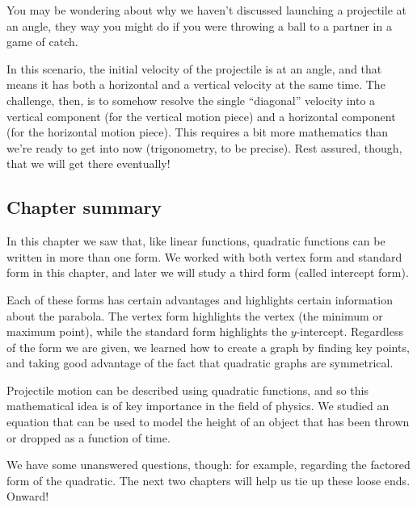 You may be wondering about why we haven't discussed launching a projectile at an angle, they way you might do if you were throwing a ball to a partner in a game of catch.

In this scenario, the initial velocity of the projectile is at an angle, and that means it has both a horizontal and a vertical velocity at the same time. The challenge, then, is to somehow resolve the single ``diagonal'' velocity into a vertical component (for the vertical motion piece) and a horizontal component (for the horizontal motion piece). This requires a bit more mathematics than we're ready to get into now (trigonometry, to be precise). Rest assured, though, that we will get there eventually!


\subsection*{Chapter summary}

In this chapter we saw that, like linear functions, quadratic functions can be written in more than one form. We worked with both vertex form and standard form in this chapter, and later we will study a third form (called intercept form).

Each of these forms has certain advantages and highlights certain information about the parabola. The vertex form highlights the vertex (the minimum or maximum point), while the standard form highlights the $y$-intercept. Regardless of the form we are given, we learned how to create a graph by finding key points, and taking good advantage of the fact that quadratic graphs are symmetrical.

Projectile motion can be described using quadratic functions, and so this mathematical idea is of key importance in the field of physics. We studied an equation that can be used to model the height of an object that has been thrown or dropped as a function of time.

We have some unanswered questions, though: for example, regarding the factored form of the quadratic. The next two chapters will help us tie up these loose ends. Onward!